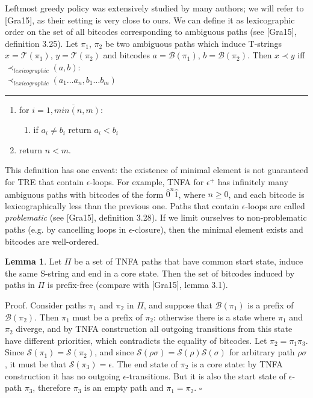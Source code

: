 \documentclass{article}
\newcommand{\Xeq}{\!=\!}
\newcommand{\XB}{\mathcal{B}}
\newcommand{\XS}{\mathcal{S}}
\newcommand{\XT}{\mathcal{T}}
\theoremstyle{definition}
\newtheorem{XLem}{Lemma}
\begin{document}
\begin{multicols}{2}
Leftmost greedy policy was extensively studied by many authors; we will refer to [Gra15], as their setting is very close to ours.
We can define it as lexicographic order on the set of all bitcodes corresponding to ambiguous paths
(see [Gra15], definition 3.25).
Let $\pi_1$, $\pi_2$ be two ambiguous paths which induce T-strings $x \Xeq \XT(\pi_1)$, $y \Xeq \XT(\pi_2)$
and bitcodes $a \Xeq \XB(\pi_1)$, $b \Xeq \XB(\pi_2)$.
Then $x \prec y$ iff $\prec_{lexicographic} (a, b)$:
\\

    $\prec_{lexicographic} (a_1 \dots a_n, b_1 \dots b_m)$
    \hrule
    \begin{enumerate}[leftmargin=0in]
        \smallskip
        \item[] for $i \Xeq \overline{1, min(n, m)}$:
        \begin{enumerate}
            \item[] if $a_i \!\neq\! b_i$ return $a_i \!<\! b_i$
        \end{enumerate}
        \item[] return $n \!<\! m$.
        \\
    \end{enumerate}
    \bigskip

This definition has one caveat: the existence of minimal element is not guaranteed for TRE that contain $\epsilon$-loops.
For example, TNFA for $\epsilon^+$ has infinitely many ambiguous paths with bitcodes
of the form $\widehat{0}^n \widehat{1}$, where $n \!\geq\! 0$,
and each bitcode is lexicographically less than the previous one.
Paths that contain $\epsilon$-loops are called \emph{problematic} (see [Gra15], definition 3.28).
If we limit ourselves to non-problematic paths (e.g. by cancelling loops in $\epsilon$-closure),
then the minimal element exists and bitcodes are well-ordered.

\begin{XLem}\label{lemma_bitcodes}
Let $\Pi$ be a set of TNFA paths that have common start state, induce the same S-string and end in a core state.
Then the set of bitcodes induced by paths in $\Pi$ is prefix-free
(compare with [Gra15], lemma 3.1).

\smallskip

Proof.
Consider paths $\pi_1$ and $\pi_2$ in $\Pi$,
and suppose that $\XB(\pi_1)$ is a prefix of $\XB(\pi_2)$.
Then $\pi_1$ must be a prefix of $\pi_2$: otherwise there is a state where $\pi_1$ and $\pi_2$ diverge,
and by TNFA construction all outgoing transitions from this state have different priorities,
which contradicts the equality of bitcodes.
Let $\pi_2 \Xeq \pi_1 \pi_3$.
Since $\XS(\pi_1) \Xeq \XS(\pi_2)$, and since $\XS(\rho\sigma) \Xeq \XS(\rho)\XS(\sigma)$ for arbitrary path $\rho\sigma$,
it must be that $\XS(\pi_3) \Xeq \epsilon$.
The end state of $\pi_2$ is a core state: by TNFA construction it has no outgoing $\epsilon$-transitions.
But it is also the start state of $\epsilon$-path $\pi_3$, therefore $\pi_3$ is an empty path and $\pi_1 \Xeq \pi_2$.
$\square$
\end{XLem}


\end{multicols}
\end{document}
